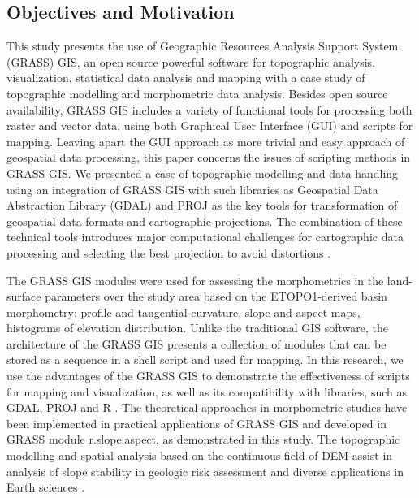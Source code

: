 \documentclass[technologies,article,submit,pdftex,moreauthors]{Definitions/mdpi}
\begin{document}
\subsection{Objectives and Motivation}
This study presents the use of Geographic Resources Analysis Support System (GRASS) GIS, an open source powerful software for topographic analysis, visualization, statistical data analysis and mapping with a case study of topographic modelling and morphometric data analysis. Besides open source availability, GRASS GIS includes a variety of functional tools for processing both raster and vector data, using both Graphical User Interface (GUI) and scripts for mapping. Leaving apart the GUI approach as more trivial and easy approach of geospatial data processing, this paper concerns the issues of scripting methods in GRASS GIS. We presented a case of topographic modelling and data handling using an integration of GRASS GIS with such libraries as Geospatial Data Abstraction Library (GDAL) and PROJ as the key tools for transformation of geospatial data formats and cartographic projections. The combination of these technical tools introduces major computational challenges for cartographic data processing and selecting the best projection to avoid distortions \cite{Kiani}.

The GRASS GIS modules were used for assessing the morphometrics in the land-surface parameters over the study area based on the ETOPO1-derived basin morphometry: profile and tangential curvature, slope and aspect maps, histograms of elevation distribution. Unlike the traditional GIS software, the architecture of the GRASS GIS presents a collection of modules that can be stored as a sequence in a shell script and used for mapping. In this research, we use the advantages of the GRASS GIS to demonstrate the effectiveness of scripts for mapping and visualization, as well as its compatibility with libraries, such as GDAL, PROJ and R \cite{Bivand2000,Bivand1999,app122412554,Grohmann}. The theoretical approaches in morphometric studies \cite{Chapman} have been implemented in practical applications of GRASS GIS and developed in GRASS module r.slope.aspect, as demonstrated in this study.  The topographic modelling and spatial analysis based on the continuous field of DEM assist in analysis of slope stability in geologic risk assessment and diverse applications in Earth sciences \cite{HofierkaSuri,Mitas1999,Mitasovaetal1996}. 
\end{document}
